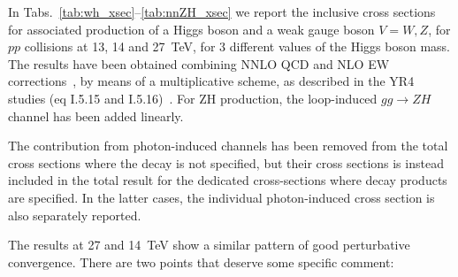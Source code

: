 In Tabs.~\ref{tab:wh_xsec}--\ref{tab:nnZH_xsec}
we report the inclusive cross sections for associated production of a Higgs
boson and a weak gauge boson $V=W,Z$, for $pp$ collisions at 13, 14 and 27~TeV, for 3 different
values of the Higgs boson mass.  The results have been obtained combining
NNLO QCD and NLO EW
corrections~\cite{Harlander:2018yio,Denner:2014cla,Harlander:2014wda,
Altenkamp:2012sx,Denner:2011id,Brein:2003wg,Ciccolini:2003jy}, by
means of a multiplicative scheme, as described in the YR4 studies (eq
I.5.15 and I.5.16)~\cite{deFlorian:2016spz}.  For ZH production, the
loop-induced $gg\rightarrow ZH$ channel has been added linearly.

The contribution from photon-induced channels has been removed from
the total cross sections where the decay is not specified, but their
cross sections is instead included in the total result for the
dedicated cross-sections where decay products are specified. In the
latter cases, the individual photon-induced cross section is also
separately reported.

The results at 27 and 14~TeV show a similar pattern of good
perturbative convergence. There are two points that deserve some
specific comment:

